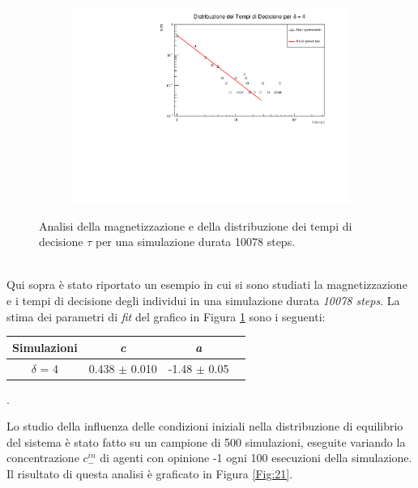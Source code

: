 \documentclass[letterpaper,10pt]{article}
\begin{document}
\begin{figure}
\ContinuedFloat
\centering
\begin{subfigure}[h]{\linewidth}
\centering
\includegraphics[width=\linewidth]{Gravitazione/tau_10078.pdf}
\end{subfigure}
\label{Fig:20}
\caption{Analisi della magnetizzazione e della distribuzione dei tempi di decisione $\tau$ per una simulazione durata 10078 steps.}

\end{figure}\\
Qui sopra è stato riportato un esempio in cui si sono studiati la magnetizzazione e i tempi di decisione degli individui in una simulazione durata \textit{10078 steps}.
La stima dei parametri di \textit{fit} del grafico in Figura \ref{Fig:20} sono i seguenti:\\
\begin{center}
\begin{tabular}{ |c|c|c|c| } 
\hline
 Simulazioni & \textit{c} & \textit{a} \\
\hline
\multirow{1}{3em}{$\delta$ = 4 }
& 0.438 $\pm$ 0.010 & -1.48 $\pm$ 0.05 \\ 
\hline
\end{tabular}
\end{center}.


Lo studio della influenza delle condizioni iniziali nella distribuzione di equilibrio del sistema è stato fatto su un campione di 500 simulazioni, eseguite variando la concentrazione $c^{in}_{-}$ di agenti con opinione -1 ogni 100 esecuzioni della simulazione. Il risultato di questa analisi è graficato in Figura \ref{Fig:21}.
\end{document}
